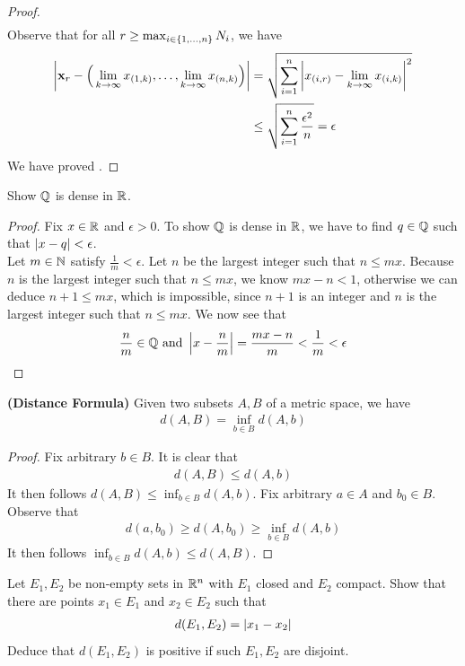 \documentclass{report}
\begin{document}
\begin{proof}
\begin{align*}
\end{align*}
Observe that for all $r\geq \max_{i\in \{ 1,\dots,n \}} N_i$, we have 
\begin{align*}
\left|\textbf{x}_r - \Big(\lim_{k\to \infty}x_{(1,k)},\dots ,\lim_{k\to \infty}x_{(n,k)} \Big)\right|&=\sqrt{\sum_{i=1}^n \left|x_{(i,r)}- \lim_{k\to \infty}x_{(i,k)}\right|^2} \\
&\leq \sqrt{\sum_{i=1}^n \frac{\epsilon^2}{n}}=\epsilon 
\end{align*}
We have proved .











\end{proof}
\begin{question}{}{}
Show $\mathbb{Q}$ is dense in $\mathbb{R}$. 
\end{question}
\begin{proof}
Fix $x\in\mathbb{R}$ and $\epsilon >0$. To show $\mathbb{Q}$ is dense in  $\mathbb{R}$, we have to find $q\in\mathbb{Q}$ such that $\left|x-q\right|<\epsilon $.\\

Let $m\in\mathbb{N}$ satisfy $\frac{1}{m}<\epsilon $. Let $n$ be the largest integer such that $n\leq mx$. Because $n$ is the largest integer such that $n\leq mx$, we know $mx-n<1$, otherwise we can deduce $n+1\leq mx$, which is impossible, since $n+1$ is an integer and $n$ is the largest integer such that $n\leq mx$. We now see that 
\begin{align*}
\frac{n}{m}\in\mathbb{Q} \text{ and }\left|x-\frac{n}{m}\right|=\frac{mx-n}{m}< \frac{1}{m}<\epsilon 
\end{align*}



\end{proof}
\begin{theorem}
\textbf{(Distance Formula)} Given two subsets $A,B$ of a metric space, we have 
\begin{align*}
d(A,B)= \inf_{b \in B}d(A,b)
\end{align*}
\end{theorem}
\begin{proof}
Fix arbitrary $b \in B$. It is clear that 
\begin{align*}
d(A,B)\leq d(A,b)
\end{align*}
It then follows $d(A,B)\leq \inf_{b \in B}d(A,b)$. Fix arbitrary $a \in A$ and $b_0 \in B$. Observe that 
\begin{align*}
d(a,b_0)\geq  d(A,b_0) \geq \inf_{b \in B}d(A,b)
\end{align*}
It then follows $\inf_{b \in B}d(A,b)\leq d(A,B)$. 
\end{proof}
\begin{question}{}{}
Let $E_1,E_2$ be non-empty sets in  $\mathbb{R}^n$ with $E_1$ closed and  $E_2$ compact. Show that there are points  $x_1\in E_1$ and $x_2 \in E_2$ such that 
\begin{align*}
d(E_1,E_2)=\left|x_1-x_2\right|
\end{align*}
Deduce that $d(E_1,E_2)$ is positive if such $E_1,E_2$ are disjoint. 
\end{question}
\end{document}
